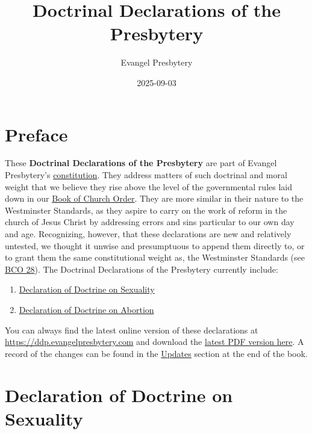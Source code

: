 \documentclass[
]{book}
\title{Doctrinal Declarations of the Presbytery}
\author{Evangel Presbytery}
\date{2025-09-03}
\begin{document}
\maketitle



{
\hypersetup{linkcolor=}
\setcounter{tocdepth}{1}
\tableofcontents
}
\hypertarget{preface}{%
\chapter*{Preface}\label{preface}}

These \textbf{Doctrinal Declarations of the Presbytery} are part of Evangel Presbytery's \href{https://bco.evangelpresbytery.com/index.html\#c.-constitution-defined}{constitution}. They address matters of such doctrinal and moral weight that we believe they rise above the level of the governmental rules laid down in our \href{https://bco.evangelpresbytery.com/}{Book of Church Order}. They are more similar in their nature to the Westminster Standards, as they aspire to carry on the work of reform in the church of Jesus Christ by addressing errors and sins particular to our own day and age. Recognizing, however, that these declarations are new and relatively untested, we thought it unwise and presumptuous to append them directly to, or to grant them the same constitutional weight as, the Westminster Standards (see \href{https://bco.evangelpresbytery.com/form-of-government.html\#amending-the-constitution-of-the-church}{BCO 28}). The Doctrinal Declarations of the Presbytery currently include:

\begin{enumerate}
\def\labelenumi{\arabic{enumi}.}
\item
  \protect\hyperlink{declaration-of-doctrine-on-sexuality}{Declaration of Doctrine on Sexuality}
\item
  \protect\hyperlink{declaration-of-doctrine-on-abortion}{Declaration of Doctrine on Abortion}
\end{enumerate}

You can always find the latest online version of these declarations at \url{https://ddp.evangelpresbytery.com} and download the \href{https://ddp.evangelpresbytery.com/evangel-presbytery-ddp.pdf}{latest PDF version here}. A record of the changes can be found in the \href{https://ddp.evangelpresbytery.com/updates.html}{Updates} section at the end of the book.

\mainmatter

\hypertarget{declaration-of-doctrine-on-sexuality}{%
\chapter*{Declaration of Doctrine on Sexuality}\label{declaration-of-doctrine-on-sexuality}}
\end{document}
